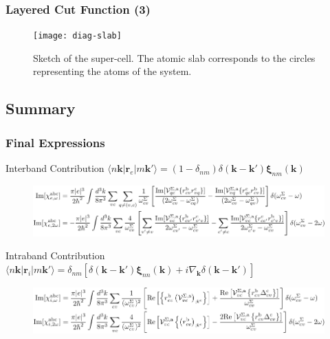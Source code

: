 \documentclass{beamer}
\begin{document}
\begin{frame}
\frametitle{Layered Cut Function (3)}
\begin{figure}
\centering
\texttt{[image: diag-slab]}
\caption{Sketch of the super-cell. The atomic slab corresponds to the circles
representing the atoms of the system.}
\end{figure}
\end{frame}


\subsection{Summary}

\begin{frame}
\frametitle{Final Expressions}
\begin{block}{Interband Contribution {\tiny $\langle n\mathbf{k}|
\mathbf{r}_{e} |m\mathbf{k}'\rangle = (1- \delta_{nm})
\delta(\mathbf{k}-\mathbf{k}')\boldsymbol{\xi}_{nm}(\mathbf{k})$}}
\begin{figure}
\centering
\includegraphics[scale=0.70]{chis_inter}
\end{figure}
\end{block}
\begin{alertblock}{Intraband Contribution {\tiny $\langle n\mathbf{k}\vert
\mathbf{r}_{i} |m\mathbf{k}'\rangle = \delta_{nm}
\left[\delta(\mathbf{k} - \mathbf{k}')\boldsymbol{\xi}_{nn}(\mathbf{k}) +
i\nabla_{\mathbf{k}}\delta(\mathbf{k} - \mathbf{k}')\right]$}}
\begin{figure}
\centering
\includegraphics[scale=0.70]{chis_intra}
\end{figure}
\end{alertblock}
\end{frame}
\end{document}
